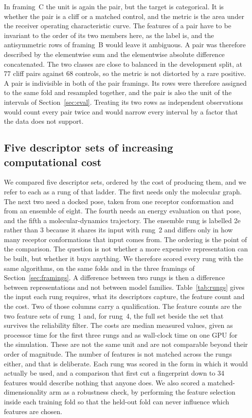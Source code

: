 In framing~C the unit is again the pair, but the target is categorical. It is whether
the pair is a cliff or a matched control, and the metric is the area under the receiver
operating characteristic curve. The features of a pair have to be invariant to the
order of its two members here, as the label is, and the antisymmetric rows of framing~B
would leave it ambiguous. A pair was therefore described by the elementwise sum and the
elementwise absolute difference concatenated. The two classes are close to balanced in
the development split, at 77 cliff pairs against 68 controls, so the metric is not
distorted by a rare positive. A pair is indivisible in both of the pair framings. Its
rows were therefore assigned to the same fold and resampled together, and the pair is
also the unit of the intervals of Section~\ref{sec:eval}. Treating its two rows as
independent observations would count every pair twice and would narrow every interval
by a factor that the data does not support.

\subsection{Five descriptor sets of increasing computational
cost}\label{sec:rungs}

We compared five descriptor sets, ordered by the cost of producing them, and we refer
to each as a rung of that ladder. The first needs only the molecular graph. The next
two need a docked pose, taken from one receptor conformation and from an ensemble of
eight. The fourth needs an energy evaluation on that pose, and the fifth a
molecular-dynamics trajectory. The ensemble rung is labelled 2e rather than 3 because
it shares its input with rung~2 and differs only in how many receptor conformations
that input comes from. The ordering is the point of the comparison. The question is not
whether a more expensive representation can be built, but whether it buys anything. We
therefore scored every rung with the same algorithms, on the same folds and in the
three framings of Section~\ref{sec:framings}. A difference between two rungs is then a
difference between representations and not between model families.
Table~\ref{tab:rungs} gives the input each rung requires, what its descriptors capture,
the feature count and the cost. Two of those columns carry a qualification. The feature
counts are the two feature sets of rung~1 and, for rung~4, the full set beside the set
that survives the reliability filter. The costs are median measured values, given as
processor time for the first three rungs and as wall-clock time on one GPU for the
simulation. These are not the same unit and are not comparable beyond their order of
magnitude. The number of features is not matched across the rungs either, and that is
deliberate. Each rung was scored in the form in which it would actually be used, and a
comparison that first cut a fingerprint down to 34 features would describe nothing that
anyone does. We also scored a matched-dimensionality arm as a robustness check, by
performing the feature selection inside each training fold so that the held-out fold
can never influence which features are chosen.

